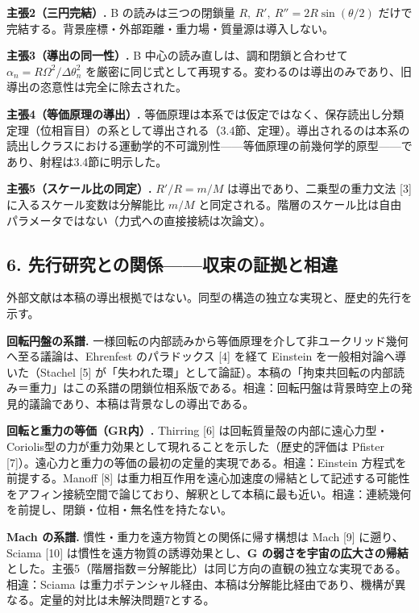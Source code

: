 \documentclass[
  a4paper,
]{ltjsarticle}
\begin{document}
\textbf{主張2（三円完結）.} B の読みは三つの閉鎖量
\(R,\ R',\ R''=2R\sin(\theta/2)\)
だけで完結する。背景座標・外部距離・重力場・質量源は導入しない。

\textbf{主張3（導出の同一性）.} B 中心の読み直しは、調和閉鎖と合わせて
\(\alpha_n=R\Omega^2/\Delta\theta_n^2\)
を厳密に同じ式として再現する。変わるのは導出のみであり、旧導出の恣意性は完全に除去された。

\textbf{主張4（等価原理の導出）.}
等価原理は本系では仮定ではなく、保存読出し分類定理（位相盲目）の系として導出される（3.4節、定理）。導出されるのは本系の読出しクラスにおける運動学的不可識別性------等価原理の前幾何学的原型------であり、射程は3.4節に明示した。

\textbf{主張5（スケール比の同定）.} \(R'/R=m/M\)
は導出であり、二乗型の重力文法 {[}3{]} に入るスケール変数は分解能比
\(m/M\)
と同定される。階層のスケール比は自由パラメータではない（力式への直接接続は次論文）。

\subsection{6.
先行研究との関係------収束の証拠と相違}\label{ux5148ux884cux7814ux7a76ux3068ux306eux95a2ux4fc2ux53ceux675fux306eux8a3cux62e0ux3068ux76f8ux9055}

外部文献は本稿の導出根拠ではない。同型の構造の独立な実現と、歴史的先行を示す。

\textbf{回転円盤の系譜.}
一様回転の内部読みから等価原理を介して非ユークリッド幾何へ至る議論は、Ehrenfest
のパラドックス {[}4{]} を経て Einstein を一般相対論へ導いた（Stachel
{[}5{]}
が「失われた環」として論証）。本稿の「拘束共回転の内部読み＝重力」はこの系譜の閉鎖位相系版である。相違：回転円盤は背景時空上の発見的議論であり、本稿は背景なしの導出である。

\textbf{回転と重力の等価（GR内）.} Thirring {[}6{]}
は回転質量殻の内部に遠心力型・Coriolis型の力が重力効果として現れることを示した（歴史的評価は
Pfister
{[}7{]}）。遠心力と重力の等価の最初の定量的実現である。相違：Einstein
方程式を前提する。Manoff {[}8{]}
は重力相互作用を遠心加速度の帰結として記述する可能性をアフィン接続空間で論じており、解釈として本稿に最も近い。相違：連続幾何を前提し、閉鎖・位相・無名性を持たない。

\textbf{Mach の系譜.} 慣性・重力を遠方物質との関係に帰す構想は Mach
{[}9{]} に遡り、Sciama {[}10{]}
は慣性を遠方物質の誘導効果とし、\textbf{G
の弱さを宇宙の広大さの帰結}とした。主張5（階層指数＝分解能比）は同じ方向の直観の独立な実現である。相違：Sciama
は重力ポテンシャル経由、本稿は分解能比経由であり、機構が異なる。定量的対比は未解決問題7とする。
\end{document}
